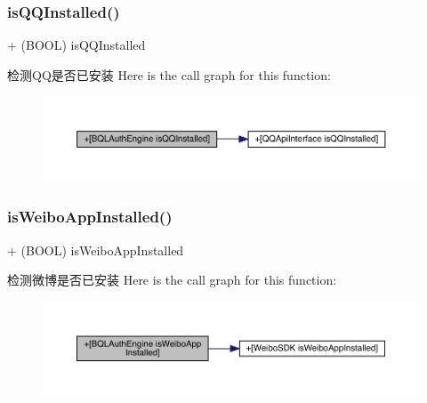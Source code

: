 \subsubsection{\texorpdfstring{is\+Q\+Q\+Installed()}{isQQInstalled()}}
{\footnotesize\ttfamily + (B\+O\+OL) is\+Q\+Q\+Installed \begin{DoxyParamCaption}{ }\end{DoxyParamCaption}}

检测\+Q\+Q是否已安装 Here is the call graph for this function\+:\nopagebreak
\begin{figure}[H]
\begin{center}
\leavevmode
\includegraphics[width=350pt]{interface_b_q_l_auth_engine_ad5464cda3e1336c1d315965f74298d03_cgraph}
\end{center}
\end{figure}
\mbox{\label{interface_b_q_l_auth_engine_ae7b4a462be6759372ef420fb2542356b}} 
\subsubsection{\texorpdfstring{is\+Weibo\+App\+Installed()}{isWeiboAppInstalled()}}
{\footnotesize\ttfamily + (B\+O\+OL) is\+Weibo\+App\+Installed \begin{DoxyParamCaption}{ }\end{DoxyParamCaption}}

检测微博是否已安装 Here is the call graph for this function\+:\nopagebreak
\begin{figure}[H]
\begin{center}
\leavevmode
\includegraphics[width=350pt]{interface_b_q_l_auth_engine_ae7b4a462be6759372ef420fb2542356b_cgraph}
\end{center}
\end{figure}
\mbox{\label{interface_b_q_l_auth_engine_ab080654fd3117bee16016ec387a6e512}} 
